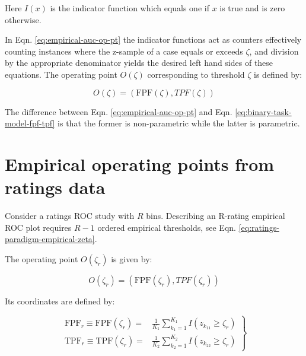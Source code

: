 \documentclass[
]{book}
\begin{document}
Here \(I(x)\) is the indicator function which equals one if \(x\) is true and is zero otherwise.

In Eqn. \eqref{eq:empirical-auc-op-pt} the indicator functions act as counters effectively counting instances where the z-sample of a case equals or exceeds \(\zeta\), and division by the appropriate denominator yields the desired left hand sides of these equations. The operating point \(O(\zeta)\) corresponding to threshold \(\zeta\) is defined by:

\begin{equation}
O\left ( \zeta \right ) = \left ( \text{FPF}\left ( \zeta \right ), TPF\left ( \zeta \right ) \right )
\label{eq:empirical-operating-point}
\end{equation}

The difference between Eqn. \eqref{eq:empirical-auc-op-pt} and Eqn. \eqref{eq:binary-task-model-fpf-tpf} is that the former is non-parametric while the latter is parametric.

\hypertarget{empirical-auc-operating-points}{%
\section{Empirical operating points from ratings data}\label{empirical-auc-operating-points}}

Consider a ratings ROC study with \(R\) bins. Describing an R-rating empirical ROC plot requires \(R-1\) ordered empirical thresholds, see Eqn. \eqref{eq:ratings-paradigm-empirical-zeta}.

The operating point \(O(\zeta_r)\) is given by:

\begin{equation}
O\left ( \zeta_r \right ) = \left ( \text{FPF}\left ( \zeta_r \right ), TPF\left ( \zeta_r \right ) \right )
\label{eq:empirical-operating-point-zeta-r}
\end{equation}

Its coordinates are defined by:

\begin{equation} 
\left.
\begin{aligned}
\text{FPF}_r \equiv \text{FPF}\left ( \zeta_r \right )=&\frac {1} {K_1} \sum_{k_1=1}^{K_1}I \left ( z_{k_11} \geq  \zeta_r\right ) \\
\text{TPF}_r \equiv \text{TPF}\left ( \zeta_r \right )=&\frac {1} {K_2} \sum_{k_2=1}^{K_2} I\left ( z_{k_22} \geq  \zeta_r\right )
\end{aligned}
\right \}
\label{eq:empirical-operating-point-fpf-tpf}
\end{equation}
\end{document}
